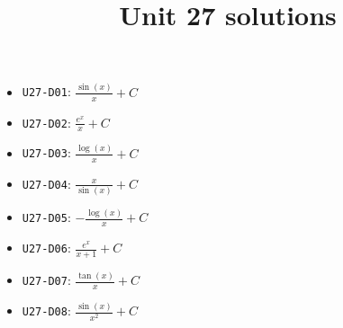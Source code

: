 \title{Unit 27 solutions}\maketitle\begin{itemize}
  \item \texttt{U27-D01}: $\frac{\sin{\left(x \right)}}{x}+C$
  \item \texttt{U27-D02}: $\frac{e^{x}}{x}+C$
  \item \texttt{U27-D03}: $\frac{\log{\left(x \right)}}{x}+C$
  \item \texttt{U27-D04}: $\frac{x}{\sin{\left(x \right)}}+C$
  \item \texttt{U27-D05}: $- \frac{\log{\left(x \right)}}{x}+C$
  \item \texttt{U27-D06}: $\frac{e^{x}}{x + 1}+C$
  \item \texttt{U27-D07}: $\frac{\tan{\left(x \right)}}{x}+C$
  \item \texttt{U27-D08}: $\frac{\sin{\left(x \right)}}{x^{2}}+C$
\end{itemize}
